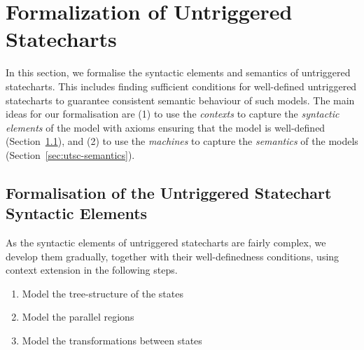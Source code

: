 \section{Formalization of Untriggered Statecharts}
\label{sec:utsc}
In this section, we formalise the syntactic elements and semantics of untriggered statecharts.
This  includes finding sufficient conditions for well-defined untriggered statecharts to guarantee consistent semantic behaviour of such models.
The main ideas for our formalisation are 
(1) to use the \EventB \emph{contexts} to capture the \emph{syntactic elements} of the model with axioms ensuring that the model is well-defined (Section~\ref{sec:utsc-syntax}), and 
(2) to use the \EventB \emph{machines} to capture the \emph{semantics} of the models (Section~\ref{sec:utsc-semantics}).

\subsection{Formalisation of the Untriggered Statechart Syntactic Elements}
\label{sec:utsc-syntax}
As the syntactic elements of untriggered statecharts are fairly complex, we develop them gradually, together with their well-definedness conditions,  using \EventB context extension in the following steps.
\begin{enumerate}
    \item Model the tree-structure of the states
    \item Model the parallel regions
    \item Model the transformations between states
\end{enumerate}


